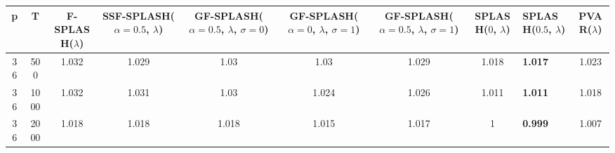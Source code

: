 \begin{tabular}{cccccccclc}
\hline
  p  &  T   &  F-SPLASH($\lambda$)  &  SSF-SPLASH($\alpha=0.5$, $\lambda$)  &  GF-SPLASH($\alpha=0.5$, $\lambda$, $\sigma=0$)  &  GF-SPLASH($\alpha=0$, $\lambda$, $\sigma=1$)  &  GF-SPLASH($\alpha=0.5$, $\lambda$, $\sigma=1$)  &  SPLASH($0$, $\lambda$)  & SPLASH($0.5$, $\lambda$)   &  PVAR($\lambda$)  \\
\hline
 36  & 500  &         1.032         &                 1.029                 &                       1.03                       &                      1.03                      &                      1.029                       &          1.018           & \textbf{1.017}             &       1.023       \\
 36  & 1000 &         1.032         &                 1.031                 &                       1.03                       &                     1.024                      &                      1.026                       &          1.011           & \textbf{1.011}             &       1.018       \\
 36  & 2000 &         1.018         &                 1.018                 &                      1.018                       &                     1.015                      &                      1.017                       &            1             & \textbf{0.999}             &       1.007       \\
\hline
\end{tabular}